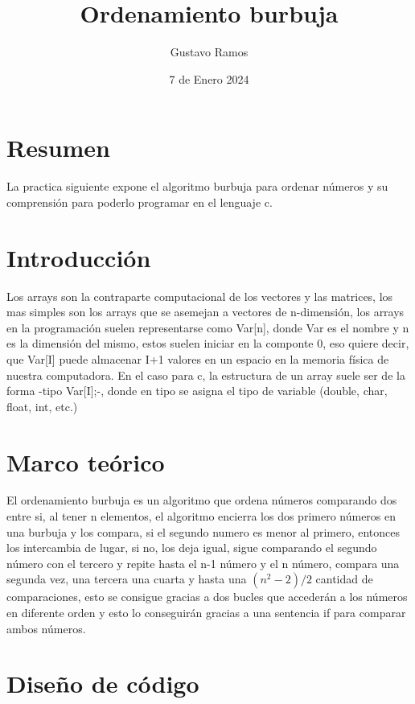 \documentclass{article}
\title{Ordenamiento burbuja}
\author{Gustavo Ramos}
\date{7 de Enero 2024}
\begin{document}
	
	\maketitle
	\begin{multicols}{2}
		
		\section{Resumen}
		La practica siguiente expone el algoritmo burbuja para ordenar números y su comprensión para poderlo programar en el lenguaje c.
		
		\section{Introducción}
		Los arrays son la contraparte computacional de los vectores y las matrices, los mas simples son los arrays que se asemejan a vectores de n-dimensión, los arrays en la programación suelen representarse como Var[n], donde Var es el nombre y n es la dimensión del mismo, estos suelen iniciar en la componte 0, eso quiere decir, que Var[I] puede almacenar I+1 valores en un espacio en la memoria física de nuestra computadora.
		En el caso para c, la estructura de un array suele ser de la forma -tipo Var[I];-, donde en tipo se asigna el tipo de variable (double, char, float, int, etc.)
		
		
		\section{Marco teórico }
		El ordenamiento burbuja es un algoritmo que ordena números comparando dos entre si, al tener n elementos, el algoritmo encierra los dos primero números en una burbuja y los compara, si el segundo numero es menor al primero, entonces los intercambia de lugar, si no, los deja igual, sigue comparando el segundo número con el tercero y repite hasta el n-1 número y el n número, compara una segunda vez, una tercera una cuarta y hasta una $(n^2-2)/2$ cantidad de comparaciones, esto se consigue gracias a dos bucles que accederán a los números en diferente orden y esto lo conseguirán gracias a una sentencia if para comparar ambos números.
		
		
		
	\end{multicols}
	
	\section{Diseño de código }
	
\end{document}
